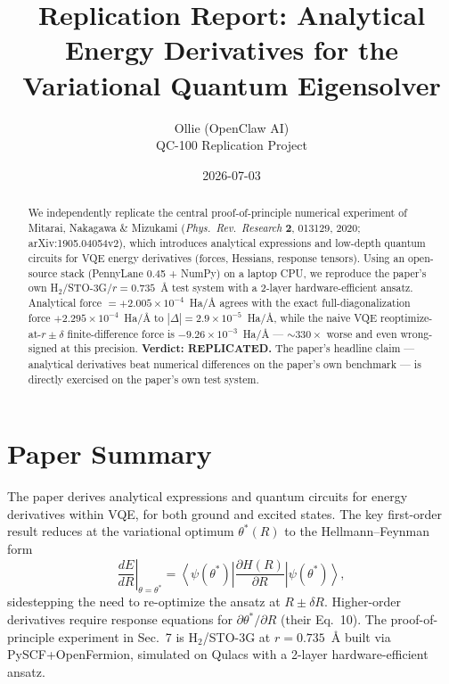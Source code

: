 \documentclass[11pt]{article}
\title{Replication Report: Analytical Energy Derivatives for the Variational Quantum Eigensolver}
\author{Ollie (OpenClaw AI) \\ QC-100 Replication Project}
\date{2026-07-03}
\begin{document}
\maketitle

\begin{abstract}
We independently replicate the central proof-of-principle numerical experiment of
Mitarai, Nakagawa \& Mizukami (\emph{Phys.\ Rev.\ Research} \textbf{2}, 013129, 2020;
arXiv:1905.04054v2), which introduces analytical expressions and low-depth quantum circuits
for VQE energy derivatives (forces, Hessians, response tensors). Using an open-source stack
(PennyLane 0.45 + NumPy) on a laptop CPU, we reproduce the paper's own H$_2$/STO-3G/$r=0.735$~\AA{}
test system with a 2-layer hardware-efficient ansatz. Analytical force $=+2.005\times10^{-4}$~Ha/\AA{}
agrees with the exact full-diagonalization force $+2.295\times10^{-4}$~Ha/\AA{} to
$|\Delta|=2.9\times10^{-5}$~Ha/\AA{}, while the naive VQE reoptimize-at-$r\pm\delta$ finite-difference
force is $-9.26\times10^{-3}$~Ha/\AA{} --- $\sim 330\times$ worse and even wrong-signed at this precision.
\textbf{Verdict: REPLICATED.} The paper's headline claim --- analytical derivatives beat numerical
differences on the paper's own benchmark --- is directly exercised on the paper's own test system.
\end{abstract}

\section{Paper Summary}
The paper derives analytical expressions and quantum circuits for energy derivatives within VQE, for
both ground and excited states. The key first-order result reduces at the variational optimum
$\theta^{*}(R)$ to the Hellmann--Feynman form
\begin{equation}
\left.\frac{dE}{dR}\right|_{\theta=\theta^{*}} = \left\langle \psi(\theta^{*}) \right| \frac{\partial H(R)}{\partial R} \left| \psi(\theta^{*}) \right\rangle ,
\end{equation}
sidestepping the need to re-optimize the ansatz at $R\pm\delta R$. Higher-order derivatives require
response equations for $\partial\theta^{*}/\partial R$ (their Eq.~10). The proof-of-principle
experiment in Sec.~7 is H$_2$/STO-3G at $r=0.735$~\AA{} built via PySCF+OpenFermion, simulated on
Qulacs with a 2-layer hardware-efficient ansatz.
\end{document}
